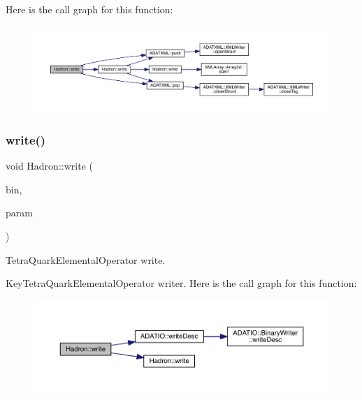 Here is the call graph for this function\+:
\nopagebreak
\begin{figure}[H]
\begin{center}
\leavevmode
\includegraphics[width=350pt]{d1/daf/namespaceHadron_aeeb688cdcca0a8494272d68cf2f15481_cgraph}
\end{center}
\end{figure}
\mbox{\label{namespaceHadron_a4fefcfe0419c7e64ff031011643eb810}} 
\subsubsection{\texorpdfstring{write()}{write()}\hspace{0.1cm}{\footnotesize\ttfamily [39/95]}}
{\footnotesize\ttfamily void Hadron\+::write (\begin{DoxyParamCaption}\item[{\mbox{\hyperlink{classADATIO_1_1BinaryWriter}{Binary\+Writer}} \&}]{bin,  }\item[{const \mbox{\hyperlink{structHadron_1_1KeyTetraQuarkElementalOperator__t}{Key\+Tetra\+Quark\+Elemental\+Operator\+\_\+t}} \&}]{param }\end{DoxyParamCaption})}



Tetra\+Quark\+Elemental\+Operator write. 

Key\+Tetra\+Quark\+Elemental\+Operator writer. Here is the call graph for this function\+:
\nopagebreak
\begin{figure}[H]
\begin{center}
\leavevmode
\includegraphics[width=350pt]{d1/daf/namespaceHadron_a4fefcfe0419c7e64ff031011643eb810_cgraph}
\end{center}
\end{figure}
\mbox{\label{namespaceHadron_abb7bfe7ab47ecc24ac8d489bdaf701d2}} 
